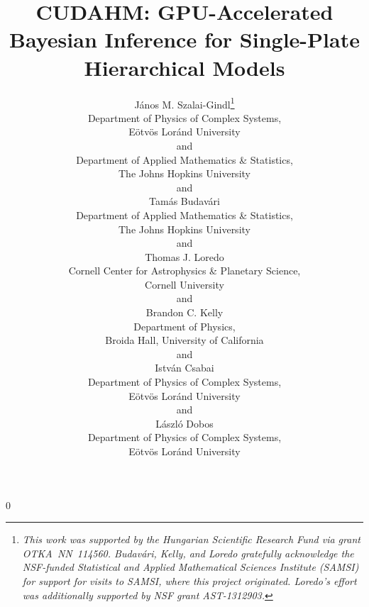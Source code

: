 \documentclass[12pt]{article}
\newcommand{\blind}{0}
\numberwithin{equation}{section}
\numberwithin{figure}{section}
\numberwithin{table}{section}
\begin{document}
\def\spacingset#1{\renewcommand{\baselinestretch}%
{#1}\small\normalsize} \spacingset{1}

\blind
{
  \title{\bf CUDAHM:  GPU-Accelerated Bayesian Inference for Single-Plate Hierarchical Models}
  \author{J\'anos M. Szalai-Gindl\thanks{
    \textit{This work was supported by the Hungarian Scientific Research Fund via grant OTKA~NN~114560.  Budav\'ari, Kelly, and Loredo gratefully acknowledge the NSF-funded Statistical and Applied Mathematical Sciences Institute (SAMSI) for support for visits to SAMSI, where this project originated. Loredo's effort was additionally supported by NSF grant AST-1312903.}}\hspace{.2cm}\\
    Department of Physics of Complex Systems,\\
    E\"otv\"os Lor\'and University\\
	and\\	
	Department of Applied Mathematics \& Statistics,\\    
    The Johns Hopkins University\\
    and \\
    Tam\'as Budav\'ari \\
    Department of Applied Mathematics \& Statistics,\\
    The Johns Hopkins University\\
    and \\
    Thomas J. Loredo \\
    Cornell Center for Astrophysics \& Planetary Science,\\
    Cornell University \\
    and \\
    Brandon C. Kelly \\
    Department of Physics,\\
    Broida Hall, University of California\\
    and \\
    Istv\'an Csabai\\
    Department of Physics of Complex Systems,\\
    E\"otv\"os Lor\'and University\\
    and \\
    L\'aszl\'o Dobos\\
    Department of Physics of Complex Systems,\\
    E\"otv\"os Lor\'and University}
    
  \maketitle
} \fi
\end{document}
